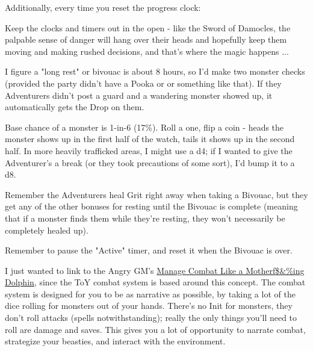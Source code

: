 {Additionally, every time you reset the progress clock:


Keep the clocks and timers out in the open - like the Sword of Damocles, the palpable sense of danger will hang over their heads and hopefully keep them moving and making rushed decisions, and that's where the magic happens ...


I figure a "long rest" or bivouac is about 8 hours, so I'd make two monster checks (provided the party didn't have a Pooka or  or something like that).  If they Adventurers didn't post a guard and a wandering monster showed up, it automatically gets the Drop on them.

Base chance of a monster is 1-in-6 (17\%). Roll a one, flip a coin - heads the monster shows up in the first half of the watch, tails it shows up in the second half. In more heavily trafficked areas, I might use a d4; if I wanted to give the Adventurer's a break (or they took precautions of some sort), I'd bump it to a d8.  

Remember the Adventurers heal Grit right away when taking a Bivouac, but they  get any of the other bonuses for resting until the Bivouac is complete (meaning that if a monster finds them while they're resting, they won't necessarily be completely healed up).

Remember to pause the "Active" timer, and reset it when the Bivouac is over.





I just wanted to link to the Angry GM's \href{https://theangrygm.com/manage-combat-like-a-dolphin/}{Manage Combat Like a Motherf\$\&\%ing Dolphin}, since the ToY combat system is based around this concept. The combat system is designed for you to be as narrative as possible, by taking a lot of the dice rolling for monsters out of your hands. There's no Init for monsters, they don't roll attacks (spells notwithstanding); really the only things you'll need to roll are damage and saves.  This gives you a lot of opportunity to narrate combat, strategize your beasties, and interact with the environment. 


}
